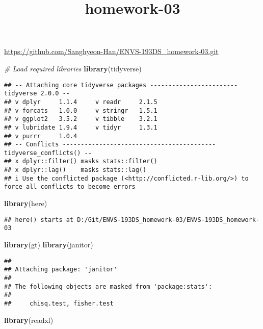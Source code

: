 \documentclass[
]{article}
\title{homework-03}
\author{}
\date{\vspace{-2.5em}}
\newenvironment{Shaded}{\begin{snugshade}}{\end{snugshade}}
\newcommand{\CommentTok}[1]{\textcolor[rgb]{0.56,0.35,0.01}{\textit{#1}}}
\newcommand{\FunctionTok}[1]{\textcolor[rgb]{0.13,0.29,0.53}{\textbf{#1}}}
\newcommand{\NormalTok}[1]{#1}
\begin{document}
\maketitle

\url{https://github.com/Sanghyeon-Han/ENVS-193DS_homework-03.git}

\begin{Shaded}
\begin{Highlighting}[]
\CommentTok{\# Load required libraries}
\FunctionTok{library}\NormalTok{(tidyverse)}
\end{Highlighting}
\end{Shaded}

\begin{verbatim}
## -- Attaching core tidyverse packages ------------------------ tidyverse 2.0.0 --
## v dplyr     1.1.4     v readr     2.1.5
## v forcats   1.0.0     v stringr   1.5.1
## v ggplot2   3.5.2     v tibble    3.2.1
## v lubridate 1.9.4     v tidyr     1.3.1
## v purrr     1.0.4     
## -- Conflicts ------------------------------------------ tidyverse_conflicts() --
## x dplyr::filter() masks stats::filter()
## x dplyr::lag()    masks stats::lag()
## i Use the conflicted package (<http://conflicted.r-lib.org/>) to force all conflicts to become errors
\end{verbatim}

\begin{Shaded}
\begin{Highlighting}[]
\FunctionTok{library}\NormalTok{(here)}
\end{Highlighting}
\end{Shaded}

\begin{verbatim}
## here() starts at D:/Git/ENVS-193DS_homework-03/ENVS-193DS_homework-03
\end{verbatim}

\begin{Shaded}
\begin{Highlighting}[]
\FunctionTok{library}\NormalTok{(gt)}
\FunctionTok{library}\NormalTok{(janitor)}
\end{Highlighting}
\end{Shaded}

\begin{verbatim}
## 
## Attaching package: 'janitor'
## 
## The following objects are masked from 'package:stats':
## 
##     chisq.test, fisher.test
\end{verbatim}

\begin{Shaded}
\begin{Highlighting}[]
\FunctionTok{library}\NormalTok{(readxl)}
\end{Highlighting}
\end{Shaded}
\end{document}

